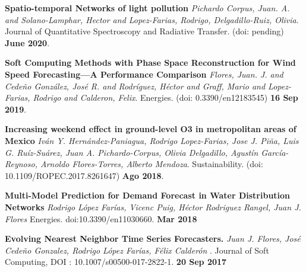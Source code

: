\documentclass[10pt]{article}
\newenvironment{innerlist}[1][\enskip\textbullet]%
        {\begin{compactitem}[#1]}{\end{compactitem}}
\begin{document}
\begin{innerlist}

\item \textbf{Spatio-temporal Networks of light pollution} \textit{{Pichardo Corpus, Juan. A. and Solano-Lamphar, Hector and Lopez-Farias, Rodrigo, Delgadillo-Ruiz, Olivia}}. {Journal of Quantitative Spectroscopy and Radiative Transfer}. (doi: pending) \textbf{June 2020}.

\item \textbf{Soft Computing Methods with Phase Space Reconstruction for Wind Speed Forecasting—A Performance Comparison} \textit{{Flores, Juan. J. and Cedeño González, José R. and Rodríguez, Héctor and Graff, Mario and Lopez-Farias, Rodrigo and Calderon, Felix}}. {Energies}. (doi: 0.3390/en12183545) \textbf{16 Sep 2019}.

\item \textbf{Increasing weekend effect in ground-level O3 in metropolitan areas of Mexico} \textit{Iván Y. Hernández-Paniagua, Rodrigo Lopez-Farias, Jose J. Piña, Luis G. Ruíz-Suárez, Juan A. Pichardo-Corpus, Olivia Delgadillo, Agustín García-Reynoso, Arnoldo Flores-Torres, Alberto Mendoza}. {Sustainability}. (doi: 10.1109/ROPEC.2017.8261647) \textbf{Ago 2018}.

\item \textbf{Multi-Model Prediction for Demand Forecast in
Water Distribution Networks} \textit{Rodrigo López Farías, Vicenc Puig, Héctor Rodriguez Rangel, Juan J. Flores} {Energies}. doi:10.3390/en11030660. \textbf{Mar 2018}

\item  \textbf{Evolving Nearest Neighbor Time Series Forecasters.} \textit{Juan J. Flores, José Cede\~no Gonzalez, Rodrigo López Farías, Félix Calderón }.  {Journal of Soft Computing},
DOI : 10.1007/s00500-017-2822-1. \textbf{20 Sep 2017}


\end{innerlist}
\end{document}
